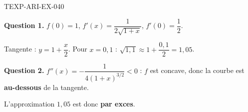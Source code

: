 \begin{corrige}{TEXP-ARI-EX-040}

\textbf{Question 1.} $f(0)=1$, $f'(x) = \dfrac{1}{2\sqrt{1+x}}$, $f'(0) = \dfrac{1}{2}$.


Tangente : $y = 1 + \dfrac{x}{2}$. Pour $x = 0{,}1$ : $\sqrt{1{,}1} \approx 1 + \dfrac{0{,}1}{2} = 1{,}05$.

\textbf{Question 2.} $f''(x) = -\dfrac{1}{4(1+x)^{3/2}} < 0$ : $f$ est concave, donc la courbe est \textbf{au-dessous} de la tangente.

L'approximation $1{,}05$ est donc \textbf{par exces}.

\end{corrige}
